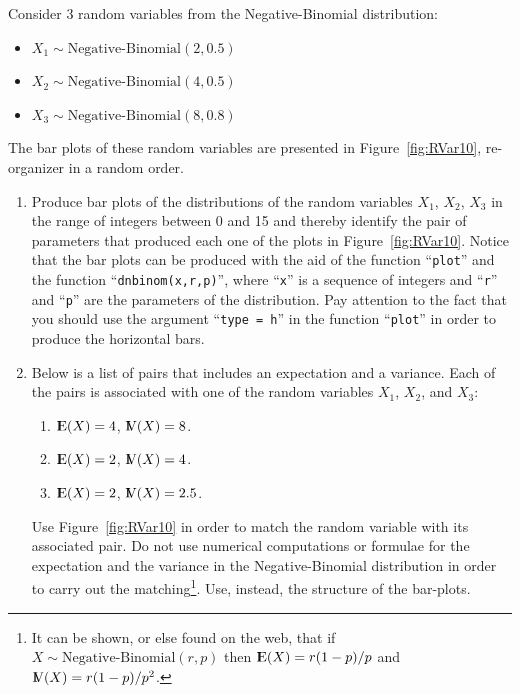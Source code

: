 \documentclass[]{krantz}
\newcommand{\Expec}{{\rm I\kern-.3em E}}
\newcommand{\Var}{{\rm I\kern-.3em V}}
\theoremstyle{definition}
\theoremstyle{definition}
\theoremstyle{definition}
\theoremstyle{remark}
\begin{document}
Consider 3 random variables from the Negative-Binomial distribution:

\begin{itemize}
\item
  \(X_1 \sim \mbox{Negative-Binomial}(2,0.5)\)
\item
  \(X_2 \sim \mbox{Negative-Binomial}(4,0.5)\)
\item
  \(X_3 \sim \mbox{Negative-Binomial}(8,0.8)\)
\end{itemize}

The bar plots of these random variables are presented in
Figure~\ref{fig:RVar10}, re-organizer in a random order.

\begin{enumerate}
\def\labelenumi{\arabic{enumi}.}
\item
  Produce bar plots of the distributions of the random variables
  \(X_1\), \(X_2\), \(X_3\) in the range of integers between 0 and 15 and
  thereby identify the pair of parameters that produced each one of
  the plots in Figure~\ref{fig:RVar10}. Notice that the bar plots
  can be produced with the aid of the function ``\texttt{plot}'' and the
  function ``\texttt{dnbinom(x,r,p)}'', where ``\texttt{x}'' is a sequence of integers
  and ``\texttt{r}'' and ``\texttt{p}'' are the parameters of the distribution. Pay
  attention to the fact that you should use the argument ``\texttt{type\ =\ h}''
  in the function ``\texttt{plot}'' in order to produce the horizontal bars.
\item
  Below is a list of pairs that includes an expectation and a
  variance. Each of the pairs is associated with one of the random
  variables \(X_1\), \(X_2\), and \(X_3\):

  \begin{enumerate}
  \def\labelenumii{\arabic{enumii}.}
  \item
    \(\Expec(X) = 4\), \(\Var(X) = 8\).
  \item
    \(\Expec(X) = 2\), \(\Var(X) = 4\).
  \item
    \(\Expec(X) = 2\), \(\Var(X) = 2.5\).
  \end{enumerate}

  Use Figure~\ref{fig:RVar10} in order to match the random
  variable with its associated pair. Do not use numerical computations
  or formulae for the expectation and the variance in the
  Negative-Binomial distribution in order to carry out the
  matching\footnote{It can be shown, or else found on the web, that if
    \(X\sim \mbox{Negative-Binomial}(r,p)\) then \(\Expec(X) = r(1-p)/p\)
    and \(\Var(X) = r(1-p)/p^2\).}. Use, instead, the structure of the bar-plots.
\end{enumerate}
\end{document}
